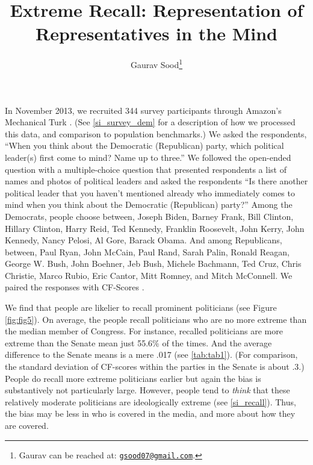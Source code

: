 \documentclass[12pt, letterpaper]{article}
\title{Extreme Recall: Representation of\\ Representatives in the Mind\\\vspace{10mm}}
\author{Gaurav Sood\thanks{Gaurav can be reached at: \href{mailto:gsood07@gmail.com}{\texttt{gsood07@gmail.com}}.}}
\begin{document}
\maketitle

\doublespacing

In November 2013, we recruited 344 survey participants through Amazon's Mechanical Turk \citep[see][]{berinsky2012}. (See \ref{si_survey_dem} for a description of how we processed this data, and comparison to population benchmarks.) We asked the respondents, ``When you think about the Democratic (Republican) party, which political leader(s) first come to mind? Name up to three.'' We followed the open-ended question with a multiple-choice question that presented respondents a list of names and photos of political leaders and asked the respondents ``Is there another political leader that you haven't mentioned already who immediately comes to mind when you think about the Democratic (Republican) party?'' Among the Democrats, people choose between, Joseph Biden, Barney Frank, Bill Clinton, Hillary Clinton, Harry Reid, Ted Kennedy, Franklin Roosevelt, John Kerry, John Kennedy, Nancy Pelosi, Al Gore, Barack Obama. And among Republicans, between, Paul Ryan, John McCain, Paul Rand, Sarah Palin, Ronald Reagan, George W. Bush, John Boehner, Jeb Bush, Michele Bachmann, Ted Cruz, Chris Christie, Marco Rubio, Eric Cantor, Mitt Romney, and Mitch McConnell. We paired the responses with CF-Scores \citep{bonica2013}.

We find that people are likelier to recall prominent politicians (see Figure \ref{fig:fig5}). On average, the people recall politicians who are no more extreme than the median member of Congress. For instance, recalled politicians are more extreme than the Senate mean just 55.6\% of the times. And the average difference to the Senate means is a mere .017 (see \ref{tab:tab1}). (For comparison, the standard deviation of CF-scores within the parties in the Senate is about .3.) People do recall more extreme politicians earlier but again the bias is substantively not particularly large. However, people tend to \textit{think} that these relatively moderate politicians are ideologically extreme (see \ref{si_recall}). Thus, the bias may be less in who is covered in the media, and more about how they are covered.
\end{document}
